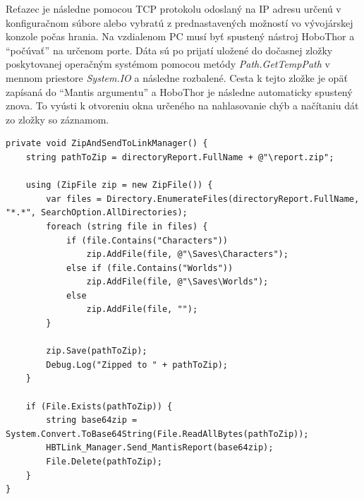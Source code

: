 \documentclass[slovak, bachelorpractice]{diploma}
\begin{document}
Reťazec je následne pomocou TCP protokolu odoslaný na IP adresu určenú v konfiguračnom súbore alebo vybratú z prednastavených možností vo vývojárskej konzole počas hrania. Na vzdialenom PC musí byť spustený nástroj HoboThor a \enquote{počúvať} na určenom porte. Dáta sú po prijatí uložené do dočasnej zložky poskytovanej operačným systémom pomocou metódy \textit{Path.GetTempPath} v mennom priestore \textit{System.IO} a následne rozbalené. Cesta k tejto zložke je opäť zapísaná do \enquote{Mantis argumentu} a HoboThor je následne automaticky spustený znova. To vyústi k otvoreniu okna určeného na nahlasovanie chýb a načítaniu dát zo zložky so záznamom.
\vspace{10pt}
\begin{lstlisting}[label=src:Zip,caption={Archivovanie zložky so zachovaním pôvodnej štruktúry}]
private void ZipAndSendToLinkManager() {
    string pathToZip = directoryReport.FullName + @"\report.zip";

    using (ZipFile zip = new ZipFile()) {
        var files = Directory.EnumerateFiles(directoryReport.FullName, "*.*", SearchOption.AllDirectories);
        foreach (string file in files) {
            if (file.Contains("Characters"))
                zip.AddFile(file, @"\Saves\Characters");
            else if (file.Contains("Worlds"))
                zip.AddFile(file, @"\Saves\Worlds");
            else
                zip.AddFile(file, "");
        }

        zip.Save(pathToZip);
        Debug.Log("Zipped to " + pathToZip);
    }

    if (File.Exists(pathToZip)) {
        string base64zip = System.Convert.ToBase64String(File.ReadAllBytes(pathToZip));
        HBTLink_Manager.Send_MantisReport(base64zip);
        File.Delete(pathToZip);
    }
}
\end{lstlisting}
\vspace{5pt}
\end{document}
